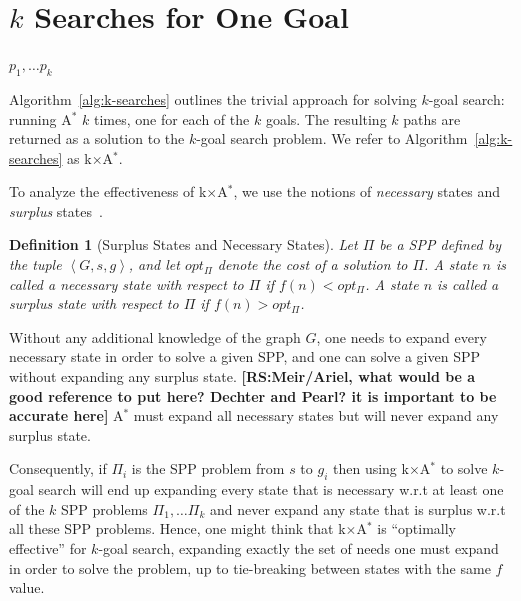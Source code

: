 \documentclass{aicom2e}
\newtheorem{definition}{Definition}
\newcommand{\kgs}{$k$-goal search}
\newcommand{\astar}{A$^*$}
\newcommand{\kxastar}{k$\times$A$^*$}
\newcommand{\tuple}[1]{\ensuremath{\left \langle #1 \right \rangle }}
\newcommand{\roni}[1]{\textbf{[RS:#1]}}
\begin{document}
\section{$k$ Searches for One Goal}
\label{sec:k-one-goal}
\begin{algorithm2e}[t!]
	\small
	\For{$i$=1 to $k$}{
		$p_i\gets$ \astar{}($s$,$g_i$)\\
	}
	\Return $p_1,\ldots p_k$\\	
	\caption{\kxastar{}: \kgs{} with $k$ \astar{}s}
	\label{alg:k-searches}
\end{algorithm2e}



Algorithm~\ref{alg:k-searches} outlines the trivial approach for solving \kgs{}: running \astar{} $k$ times, one for each of the $k$ goals. The resulting $k$ paths are returned as a solution to the \kgs{} problem. We refer to Algorithm~\ref{alg:k-searches} as \kxastar{}. 


To analyze the effectiveness of \kxastar{}, we use the notions of {\em necessary} states and {\em surplus} states~\cite{goldenberg2014enhanced}. 

\begin{definition}[Surplus States and Necessary States]
	Let $\Pi$ be a SPP defined by the tuple $\tuple{G,s,g}$, and let $opt_\Pi$ denote the cost of a solution to $\Pi$. 
	A state $n$ is called a {\em necessary} state with respect to $\Pi$ if $f(n)<opt_\Pi$. 
	A state $n$ is called a {\em surplus} state with respect to $\Pi$ if $f(n)>opt_\Pi$. 
\label{def:surplus}
\end{definition}
Without any additional knowledge of the graph $G$, one needs to expand every necessary state in order to solve a given SPP, 
and one can solve a given SPP without expanding any surplus state. \roni{Meir/Ariel, what would be a good reference to put here? Dechter and Pearl? it is important to be accurate here}
\astar{} must expand all necessary states but will never expand any surplus state. 

Consequently, if $\Pi_i$ is the SPP problem from $s$ to $g_i$ 
then using \kxastar{} to solve \kgs{} will end up expanding every state that is necessary w.r.t at least one of the $k$ SPP problems $\Pi_1,\ldots \Pi_k$ and never expand any state that is surplus w.r.t all these SPP problems. 
Hence, one might think that \kxastar{} is ``optimally effective'' for \kgs{}, 
expanding exactly the set of needs one must expand in order to solve the problem, up to tie-breaking between states with the same $f$ value. 
\end{document}
